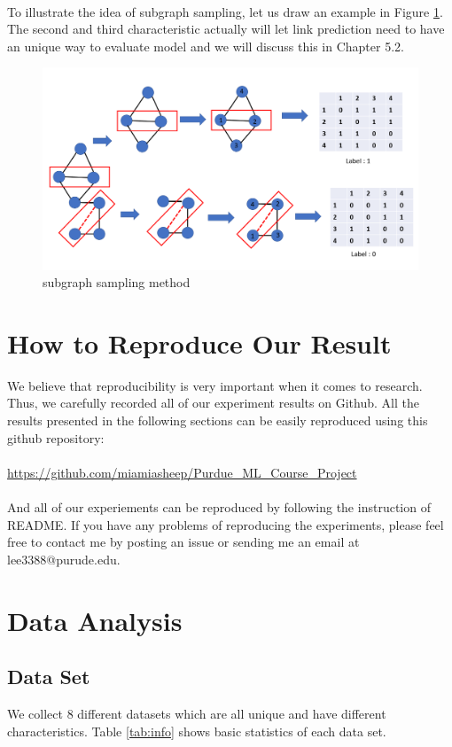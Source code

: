\documentclass[12pt]{article}
\begin{document}
\\ 
To illustrate the idea of subgraph sampling, let us draw an example in Figure \ref{fig:subsample}. 
\\
The second and third characteristic actually will let link prediction need to have an unique way to evaluate model and we will discuss this in Chapter 5.2. 
\\
\begin{figure}[h]
	\centering
	\includegraphics[scale=0.3]{subgraph_sampling_approach}
	\caption{subgraph sampling method}
	\label{fig:subsample}
\end{figure}

\section{How to Reproduce Our Result}
We believe that reproducibility is very important when it comes to research. Thus, we carefully recorded all of our experiment results on Github. All the results presented in the following sections can be easily reproduced using this github repository: 
\\
\\
\url{https://github.com/miamiasheep/Purdue\_ML\_Course\_Project}
\\
\\
And all of our experiements can be reproduced by following the instruction of README. If you have any problems of reproducing the experiments, please feel free to contact me by posting an issue or sending me an email at lee3388@purude.edu.

\section{Data Analysis}

\subsection {Data Set}
We collect 8 different datasets which are all unique and have different characteristics. Table \ref{tab:info} shows basic statistics of each data set.
\end{document}
